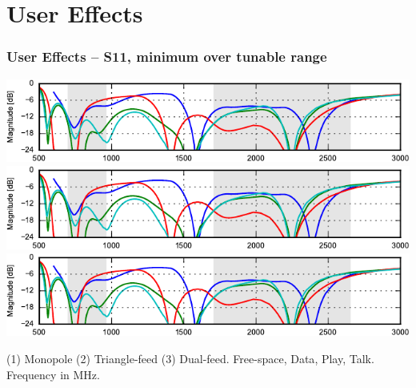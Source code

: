 \section{User Effects}
\def\legendfooter{\scriptsize{(1) Monopole (2) Triangle-feed (3) Dual-feed. \textcolor{bb}{Free-space}, \textcolor{gg}{Data}, \textcolor{rr}{Play}, \textcolor{cc}{Talk}. Frequency in MHz.}}
\begin{frame}
    \frametitle{User Effects -- S11, minimum over tunable range}
    \begin{center}
        \includegraphics{img/soren/ue/design2sn/s11top.pdf}\\
        \includegraphics{img/soren/ue/design2sn/s11top.pdf}\\
        \includegraphics{img/soren/ue/design2sn/s11top.pdf}
    \end{center}
    \legendfooter
\end{frame}

